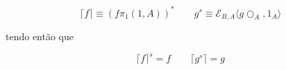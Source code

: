 \documentclass[../main.tex]{subfiles}
\begin{document}
$$\lceil f \rceil \equiv (f \pi_1(1, A))^{\ast} \qquad g^s \equiv \mathcal{E}_{B, A}\langle g \bigcirc_A, 1_A \rangle$$

tendo então que 

$$\lceil f \rceil^s = f \qquad \lceil g^s \rceil = g$$


\end{document}
